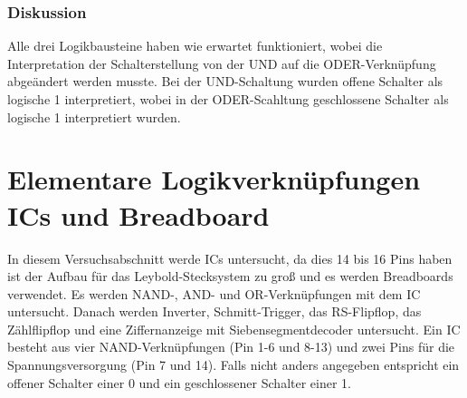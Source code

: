 \documentclass[12pt,a4paper]{article}
\begin{document}
\subsubsection*{Diskussion}

Alle drei Logikbausteine haben wie erwartet funktioniert, wobei die Interpretation der Schalterstellung von der UND auf die ODER-Verknüpfung abgeändert werden musste. Bei der UND-Schaltung wurden offene Schalter als logische 1 interpretiert, wobei in der ODER-Scahltung geschlossene Schalter als logische 1 interpretiert wurden. 

\section{Elementare Logikverknüpfungen ICs und Breadboard}

In diesem Versuchsabschnitt werde ICs untersucht, da dies 14 bis 16 Pins haben ist der Aufbau für das Leybold-Stecksystem zu groß und es werden Breadboards verwendet. Es werden NAND-, AND- und OR-Verknüpfungen mit dem IC untersucht. Danach werden Inverter, Schmitt-Trigger, das RS-Flipflop, das Zählflipflop und eine Ziffernanzeige mit Siebensegmentdecoder untersucht. Ein IC besteht aus vier NAND-Verknüpfungen (Pin 1-6 und 8-13) und zwei Pins für die Spannungsversorgung (Pin 7 und 14). Falls nicht anders angegeben entspricht ein offener Schalter einer 0 und ein geschlossener Schalter einer 1.
\end{document}
